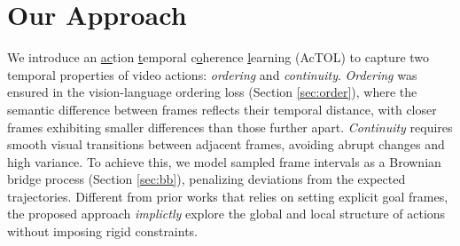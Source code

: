 \section{Our Approach}
We introduce an \underline{ac}tion \underline{t}emporal c\underline{o}herence \underline{l}earning (AcTOL) to capture two temporal properties of video actions: \textit{ordering} and \textit{continuity}. \textit{Ordering} was ensured in the vision-language ordering loss (Section \ref{sec:order}), where the semantic difference between frames reflects their temporal distance, with closer frames exhibiting smaller differences than those further apart. \textit{Continuity} requires smooth visual transitions between adjacent frames, avoiding abrupt changes and high variance. To achieve this, we model sampled frame intervals as a Brownian bridge process (Section \ref{sec:bb}), penalizing deviations from the expected trajectories. Different from prior works that relies on setting explicit goal frames, the proposed approach \textit{implictly} explore the global and local structure of actions without imposing rigid constraints.







